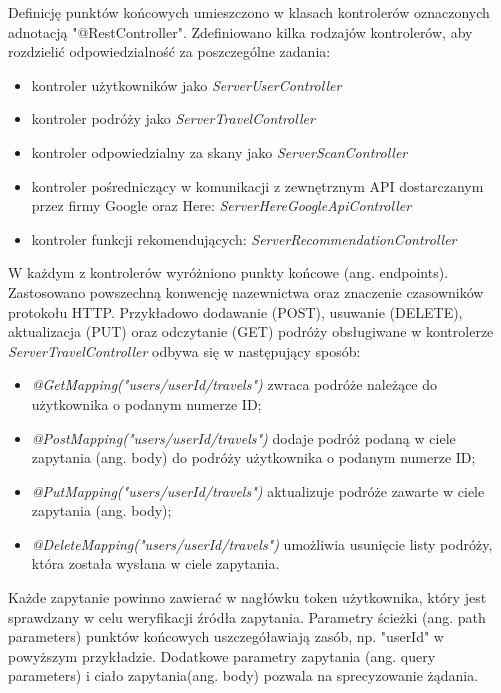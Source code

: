 \documentclass[10pt,twoside,a4paper]{report}
\begin{document}
\par Definicję punktów końcowych umieszczono w klasach kontrolerów oznaczonych adnotacją "@RestController". Zdefiniowano kilka rodzajów kontrolerów, aby rozdzielić odpowiedzialność za poszczególne zadania:
\begin{itemize}
\item kontroler użytkowników jako \textit{ServerUserController}
\item kontroler podróży jako \textit{ServerTravelController}
\item kontroler odpowiedzialny za skany jako \textit{ServerScanController}
\item kontroler pośredniczący w komunikacji z zewnętrznym API dostarczanym przez firmy Google oraz Here: \textit{ServerHereGoogleApiController}
\item kontroler funkcji rekomendujących: \textit{ServerRecommendationController}
\end{itemize}

\par W każdym z kontrolerów wyróżniono punkty końcowe (ang. endpoints). Zastosowano powszechną konwencję nazewnictwa oraz znaczenie czasowników protokołu HTTP. Przykładowo dodawanie (POST), usuwanie (DELETE), aktualizacja (PUT) oraz odczytanie (GET) podróży obsługiwane w kontrolerze \textit{ServerTravelController} odbywa się w następujący sposób:
\begin{itemize}
\item \textit{@GetMapping("users/{userId}/travels")} zwraca podróże należące do użytkownika o podanym numerze ID;
\item \textit{@PostMapping("users/{userId}/travels")} dodaje podróż podaną w ciele zapytania (ang. body) do podróży użytkownika o podanym numerze ID;
\item \textit{@PutMapping("users/{userId}/travels")} aktualizuje podróże zawarte w ciele zapytania (ang. body);
\item \textit{@DeleteMapping("users/{userId}/travels")} umożliwia usunięcie listy podróży, która została wysłana w ciele zapytania.
\end{itemize}

\par Każde zapytanie powinno zawierać w nagłówku token użytkownika, który jest sprawdzany w celu weryfikacji źródła zapytania. Parametry ścieżki (ang. path parameters) punktów końcowych uszczegóławiają zasób, np. "userId" w powyższym przykładzie. Dodatkowe parametry zapytania (ang. query parameters) i ciało zapytania(ang. body) pozwala na sprecyzowanie żądania.
\end{document}
